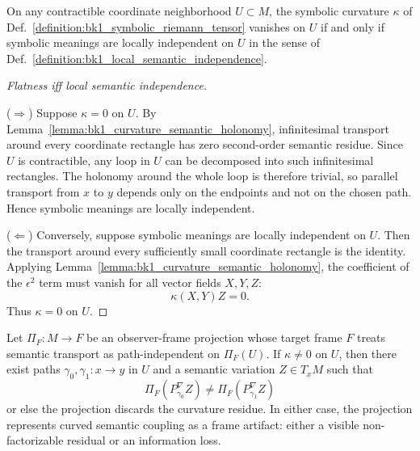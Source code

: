 \begin{proposition}
\label{proposition:bk1_curvature_semantic_entanglement}
On any contractible coordinate neighborhood $U \subset M$, the symbolic curvature
$\kappa$ of Def.~\ref{definition:bk1_symbolic_riemann_tensor} vanishes on $U$ if
and only if symbolic meanings are locally independent on $U$ in the sense of
Def.~\ref{definition:bk1_local_semantic_independence}.
\end{proposition}

\begin{proof}[Flatness iff local semantic independence]
\label{proof:bk1_curvature_semantic_entanglement}
\leavevmode

($\Rightarrow$) Suppose $\kappa=0$ on $U$. By
Lemma~\ref{lemma:bk1_curvature_semantic_holonomy}, infinitesimal transport
around every coordinate rectangle has zero second-order semantic residue. Since
$U$ is contractible, any loop in $U$ can be decomposed into such infinitesimal
rectangles. The holonomy around the whole loop is therefore trivial, so parallel
transport from $x$ to $y$ depends only on the endpoints and not on the chosen
path. Hence symbolic meanings are locally independent.

($\Leftarrow$) Conversely, suppose symbolic meanings are locally independent on
$U$. Then the transport around every sufficiently small coordinate rectangle is
the identity. Applying Lemma~\ref{lemma:bk1_curvature_semantic_holonomy}, the
coefficient of the $\epsilon^2$ term must vanish for all vector fields $X,Y,Z$:
\[
\kappa(X,Y)Z=0.
\]
Thus $\kappa=0$ on $U$.
\end{proof}

\begin{corollary}
\label{corollary:bk1_curvature_projection_residue}
Let $\Pi_F:M\to F$ be an observer-frame projection whose target frame $F$ treats
semantic transport as path-independent on $\Pi_F(U)$. If $\kappa\neq 0$ on $U$,
then there exist paths $\gamma_0,\gamma_1:x\to y$ in $U$ and a semantic
variation $Z\in T_xM$ such that
\[
\Pi_F(P^\nabla_{\gamma_0}Z) \neq \Pi_F(P^\nabla_{\gamma_1}Z)
\]
or else the projection discards the curvature residue. In either case, the
projection represents curved semantic coupling as a frame artifact: either a
visible non-factorizable residual or an information loss.
\end{corollary}

